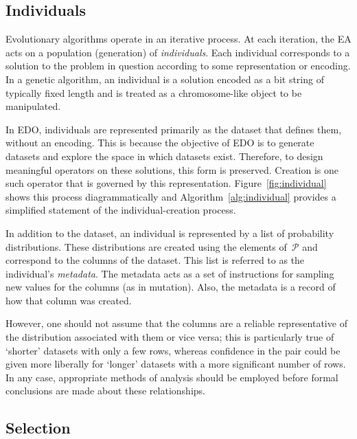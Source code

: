 \subsection{Individuals}

Evolutionary algorithms operate in an iterative process. At each iteration, the
EA acts on a population (generation) of \emph{individuals}. Each individual
corresponds to a solution to the problem in question according to some
representation or encoding. In a genetic algorithm, an individual is a solution
encoded as a bit string of typically fixed length and is treated as a
chromosome-like object to be manipulated.

In EDO, individuals are represented primarily as the dataset that defines them,
without an encoding. This is because the objective of EDO is to generate
datasets and explore the space in which datasets exist. Therefore, to design
meaningful operators on these solutions, this form is preserved. Creation is one
such operator that is governed by this representation.
Figure~\ref{fig:individual} shows this process diagrammatically and
Algorithm~\ref{alg:individual} provides a simplified statement of the
individual-creation process.

In addition to the dataset, an individual is represented by a list of
probability distributions. These distributions are created using the elements
of~\(\mathcal{P}\) and correspond to the columns of the dataset. This list is
referred to as the individual's \emph{metadata}. The metadata acts as a set of
instructions for sampling new values for the columns (as in mutation). Also, the
metadata is a record of how that column was created.

However, one should not assume that the columns are a reliable representative of
the distribution associated with them or vice versa; this is particularly true
of `shorter' datasets with only a few rows, whereas confidence in the pair could
be given more liberally for `longer' datasets with a more significant number of
rows. In any case, appropriate methods of analysis should be employed before
formal conclusions are made about these relationships.



\subsection{Selection}

